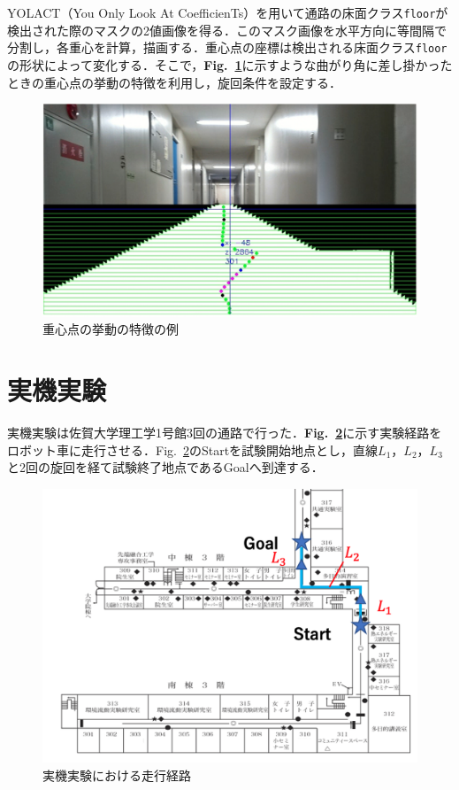 \documentclass[luatex,fleqn,twocolumn,twoside]{ltjarticle}
\begin{document}
YOLACT（You Only Look At CoefficienTs）を用いて通路の床面クラス\texttt{floor}が検出された際のマスクの2値画像を得る．このマスク画像を水平方向に等間隔で分割し，各重心を計算，描画する．重心点の座標は検出される床面クラス\texttt{floor}の形状によって変化する．そこで，{\bf Fig.~\ref{fig:example}}に示すような曲がり角に差し掛かったときの重心点の挙動の特徴を利用し，旋回条件を設定する．
\begin{figure}[htbp]
	\begin{center}
	\includegraphics[scale=0.4]{./fig/case1-2.png}
	\caption{重心点の挙動の特徴の例}
	\label{fig:example}
	\end{center}
\end{figure}
\section{\large 実機実験}
実機実験は佐賀大学理工学1号館3回の通路で行った．{\bf Fig.~\ref{fig:ex_path2}}に示す実験経路をロボット車に走行させる．{Fig.~\ref{fig:ex_path2}}のStartを試験開始地点とし，直線$L_1$，$L_2$，$L_3$と2回の旋回を経て試験終了地点であるGoalへ到達する．
\begin{figure}[tb]
	\begin{center}
	\includegraphics[scale=0.4]{./fig/ex_path2.png}
	\caption{実機実験における走行経路}
	\label{fig:ex_path2}
	\end{center}
\end{figure}
\end{document}
